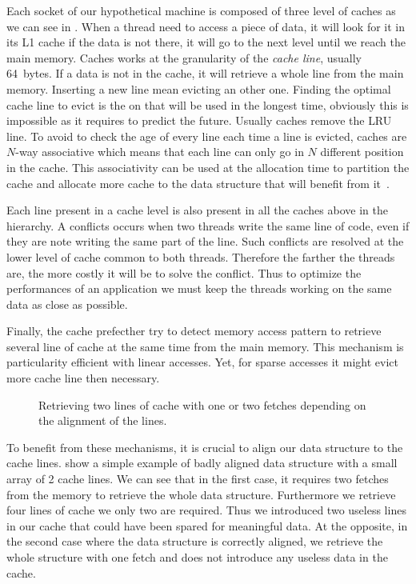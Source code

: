 Each socket of our hypothetical machine is composed of three level of caches as we can see in .
When a thread need to access a piece of data, it will look for it in its L1 cache if the data is not there, it will go to the next level until we reach the main memory.
Caches works at the granularity of the \emph{cache line}, usually \SI{64}{bytes}.
If a data is not in the cache, it will retrieve a whole line from the main memory.
Inserting a new line mean evicting an other one.
Finding the optimal cache line to evict is the on that will be used in the longest time, obviously this is impossible as it requires to predict the future.
Usually caches remove the \acrfull{LRU} line.
To avoid to check the age of every line each time a line is evicted, caches are $N$-way associative which means that each line can only go in $N$ different position in the cache.
This associativity can be used at the allocation time to partition the cache and allocate more cache to the data structure that will benefit from it~\cite{Perarnau11Controlling}.

Each line present in a cache level is also present in all the caches above in the hierarchy.
A conflicts occurs when two threads write the same line of code, even if they are note writing the same part of the line.
Such conflicts are resolved at the lower level of cache common to both threads.
Therefore the farther the threads are, the more costly it will be to solve the conflict.
Thus to optimize the performances of an application we must keep the threads working on the same data as close as possible.

Finally, the cache prefecther try to detect memory access pattern to retrieve several line of cache at the same time from the main memory.
This mechanism is particularity efficient with linear accesses.
Yet, for sparse accesses it might evict more cache line then necessary.

\begin{figure}[htb]
    \centering
    
    \caption[Example of Bad alignment]{Retrieving two lines of cache with one or two fetches depending on the alignment of the lines.}
    \label{fig:bad-align}
\end{figure}

To benefit from these mechanisms, it is crucial to align our data structure to the cache lines.
 show a simple example of badly aligned data structure with a small array of 2 cache lines.
We can see that in the first case, it requires two fetches from the memory to retrieve the whole data structure.
Furthermore we retrieve four lines of cache we only two are required.
Thus we introduced two useless lines in our cache that could have been spared for meaningful data.
At the opposite, in the second case where the data structure is correctly aligned, we retrieve the whole structure with one fetch and does not introduce any useless data in the cache.

